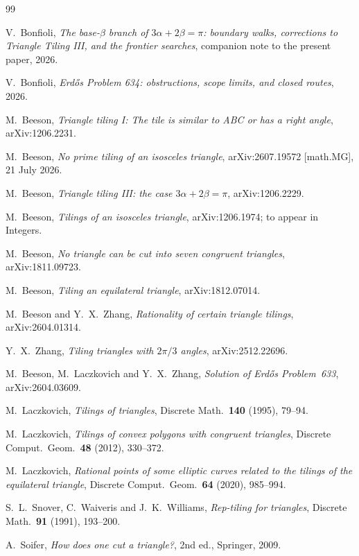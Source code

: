 \documentclass[11pt,reqno]{amsart}
\theoremstyle{plain}
\theoremstyle{definition}
\begin{document}
\begin{thebibliography}{99}

 V.~Bonfioli, \emph{The base-$\beta$ branch of $3\alpha+2\beta=\pi$: boundary walks, corrections to Triangle Tiling III, and the frontier searches}, companion note to the present paper, 2026.

 V.~Bonfioli, \emph{Erd\H{o}s Problem 634: obstructions, scope limits, and closed routes}, 2026.

 M.~Beeson, \emph{Triangle tiling I: The tile is similar to ABC or has a right
angle}, arXiv:1206.2231.

 M.~Beeson, \emph{No prime tiling of an isosceles triangle},
  arXiv:2607.19572 [math.MG], 21 July 2026.

 M.~Beeson, \emph{Triangle tiling III: the case $3\alpha+2\beta=\pi$},
arXiv:1206.2229.

 M.~Beeson, \emph{Tilings of an isosceles triangle}, arXiv:1206.1974; to appear
in Integers.

 M.~Beeson, \emph{No triangle can be cut into seven congruent triangles},
arXiv:1811.09723.

 M.~Beeson, \emph{Tiling an equilateral triangle}, arXiv:1812.07014.

 M.~Beeson and Y.~X.~Zhang, \emph{Rationality of certain triangle tilings},
arXiv:2604.01314.

 Y.~X.~Zhang, \emph{Tiling triangles with $2\pi/3$ angles}, arXiv:2512.22696.

 M.~Beeson, M.~Laczkovich and Y.~X.~Zhang, \emph{Solution of Erd\H{o}s
Problem~633}, arXiv:2604.03609.

 M.~Laczkovich, \emph{Tilings of triangles}, Discrete Math.\ \textbf{140}
(1995), 79--94.

 M.~Laczkovich, \emph{Tilings of convex polygons with congruent triangles},
Discrete Comput.\ Geom.\ \textbf{48} (2012), 330--372.

 M.~Laczkovich, \emph{Rational points of some elliptic curves related to
the tilings of the equilateral triangle}, Discrete Comput.\ Geom.\ \textbf{64} (2020), 985--994.

 S.~L.~Snover, C.~Waiveris and J.~K.~Williams, \emph{Rep-tiling for triangles},
Discrete Math.\ \textbf{91} (1991), 193--200.

 A.~Soifer, \emph{How does one cut a triangle?}, 2nd ed., Springer, 2009.

\end{thebibliography}
\end{document}

